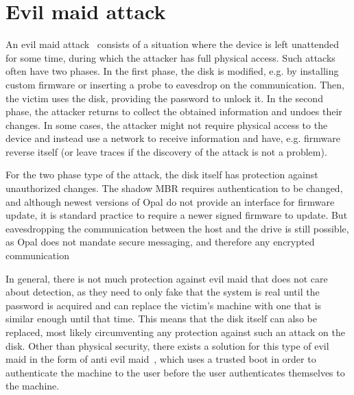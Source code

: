\section{Evil maid attack}

An evil maid attack~\cite{self_decrypting_risks,systematic_assessment_of_the_security,or something from Rutkowska directly} consists of a situation where the device is left unattended for some time, during which the attacker has full physical access. Such attacks often have two phases. In the first phase, the disk is modified, e.g. by installing custom firmware or inserting a probe to eavesdrop on the communication. Then, the victim uses the disk, providing the password to unlock it. In the second phase, the attacker returns to collect the obtained information and undoes their changes. In some cases, the attacker might not require physical access to the device and instead use a network to receive information and have, e.g. firmware reverse itself (or leave traces if the discovery of the attack is not a problem).

For the two phase type of the attack, the disk itself has protection against unauthorized changes. The shadow MBR requires authentication to be changed, and although newest versions of Opal do not provide an interface for firmware update, it is standard practice to require a newer signed firmware to update.
But eavesdropping the communication between the host and the drive is still possible, as Opal does not mandate secure messaging, and therefore any encrypted communication



In general, there is not much protection against evil maid that does not care about detection, as they need to only fake that the system is real until the password is acquired and can replace the victim's machine with one that is similar enough until that time. This means that the disk itself can also be replaced, most likely circumventing any protection against such an attack on the disk.
Other than physical security, there exists a solution for this type of evil maid in the form of anti evil maid~\cite{https://blog.invisiblethings.org/2011/09/07/anti-evil-maid.html}, which uses a trusted boot in order to authenticate the machine to the user before the user authenticates themselves to the machine.



